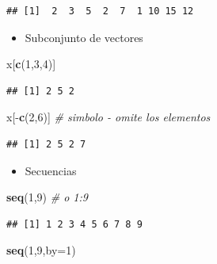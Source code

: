 \documentclass[]{article}
\def\tightlist{}
\newenvironment{Shaded}{\begin{snugshade}}{\end{snugshade}}
\newcommand{\KeywordTok}[1]{\textcolor[rgb]{0.13,0.29,0.53}{\textbf{{#1}}}}
\newcommand{\DataTypeTok}[1]{\textcolor[rgb]{0.13,0.29,0.53}{{#1}}}
\newcommand{\DecValTok}[1]{\textcolor[rgb]{0.00,0.00,0.81}{{#1}}}
\newcommand{\CommentTok}[1]{\textcolor[rgb]{0.56,0.35,0.01}{\textit{{#1}}}}
\newcommand{\NormalTok}[1]{{#1}}
\numberwithin{equation}{section}
\begin{document}
\begin{verbatim}
## [1]  2  3  5  2  7  1 10 15 12
\end{verbatim}

\begin{itemize}
\tightlist
\item
  Subconjunto de vectores
\end{itemize}

\begin{Shaded}
\begin{Highlighting}[]
\NormalTok{x[}\KeywordTok{c}\NormalTok{(}\DecValTok{1}\NormalTok{,}\DecValTok{3}\NormalTok{,}\DecValTok{4}\NormalTok{)]}
\end{Highlighting}
\end{Shaded}

\begin{verbatim}
## [1] 2 5 2
\end{verbatim}

\begin{Shaded}
\begin{Highlighting}[]
\NormalTok{x[-}\KeywordTok{c}\NormalTok{(}\DecValTok{2}\NormalTok{,}\DecValTok{6}\NormalTok{)] }\CommentTok{# simbolo - omite los elementos }
\end{Highlighting}
\end{Shaded}

\begin{verbatim}
## [1] 2 5 2 7
\end{verbatim}

\begin{itemize}
\tightlist
\item
  Secuencias
\end{itemize}

\begin{Shaded}
\begin{Highlighting}[]
\KeywordTok{seq}\NormalTok{(}\DecValTok{1}\NormalTok{,}\DecValTok{9}\NormalTok{) }\CommentTok{# o 1:9}
\end{Highlighting}
\end{Shaded}

\begin{verbatim}
## [1] 1 2 3 4 5 6 7 8 9
\end{verbatim}

\begin{Shaded}
\begin{Highlighting}[]
\KeywordTok{seq}\NormalTok{(}\DecValTok{1}\NormalTok{,}\DecValTok{9}\NormalTok{,}\DataTypeTok{by=}\DecValTok{1}\NormalTok{)}
\end{Highlighting}
\end{Shaded}
\end{document}
